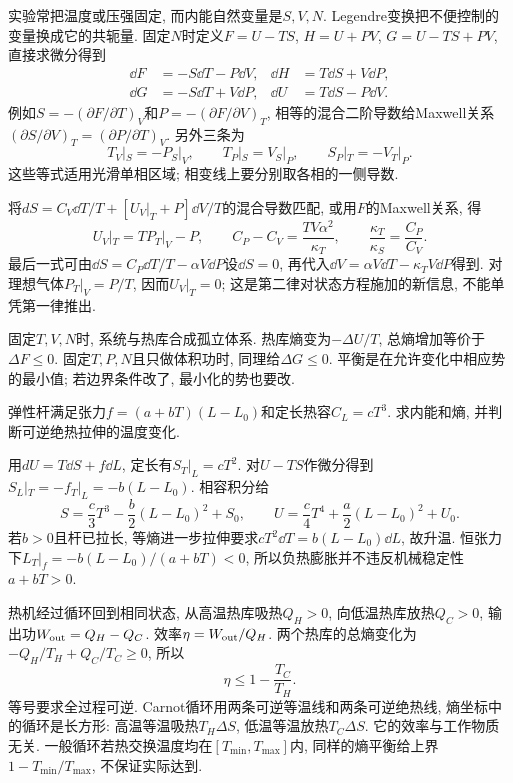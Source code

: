\label{ch:potentials}
实验常把温度或压强固定, 而内能自然变量是$S,V,N$. Legendre变换把不便控制的变量换成它的共轭量. 固定$N$时定义$F=U-TS$, $H=U+PV$, $G=U-TS+PV$, 直接求微分得到
\[
\begin{aligned}
\dd F&=-S\dd T-P\dd V,&\dd H&=T\dd S+V\dd P,\\
\dd G&=-S\dd T+V\dd P,&\dd U&=T\dd S-P\dd V.
\end{aligned}
\]
例如$S=-(\partial F/\partial T)_V$和$P=-(\partial F/\partial V)_T$, 相等的混合二阶导数给Maxwell关系$(\partial S/\partial V)_T=(\partial P/\partial T)_V$. 另外三条为
\[
T_V|_S=-P_S|_V,\qquad T_P|_S=V_S|_P,\qquad S_P|_T=-V_T|_P.
\]
这些等式适用光滑单相区域; 相变线上要分别取各相的一侧导数.

将$dS=C_V\dd T/T+[U_V|_T+P]\dd V/T$的混合导数匹配, 或用$F$的Maxwell关系, 得
\[
U_V|_T=T P_T|_V-P,\qquad
C_P-C_V=\frac{TV\alpha^2}{\kappa_T},\qquad
\frac{\kappa_T}{\kappa_S}=\frac{C_P}{C_V}.
\]
最后一式可由$\dd S=C_P\dd T/T-\alpha V\dd P$设$\dd S=0$, 再代入$\dd V=\alpha V\dd T-\kappa_TV\dd P$得到. 对理想气体$P_T|_V=P/T$, 因而$U_V|_T=0$; 这是第二律对状态方程施加的新信息, 不能单凭第一律推出.

固定$T,V,N$时, 系统与热库合成孤立体系. 热库熵变为$-\Delta U/T$, 总熵增加等价于$\Delta F\le0$. 固定$T,P,N$且只做体积功时, 同理给$\Delta G\le0$. 平衡是在允许变化中相应势的最小值; 若边界条件改了, 最小化的势也要改.

\begin{example}
弹性杆满足张力$f=(a+bT)(L-L_0)$和定长热容$C_L=cT^3$. 求内能和熵, 并判断可逆绝热拉伸的温度变化.
\end{example}
\begin{solution}
用$dU=T\dd S+f\dd L$, 定长有$S_T|_L=cT^2$. 对$U-TS$作微分得到$S_L|_T=-f_T|_L=-b(L-L_0)$. 相容积分给
\[
S=\frac c3T^3-\frac b2(L-L_0)^2+S_0,\qquad
U=\frac c4T^4+\frac a2(L-L_0)^2+U_0.
\]
若$b>0$且杆已拉长, 等熵进一步拉伸要求$cT^2\dd T=b(L-L_0)\dd L$, 故升温. 恒张力下$L_T|_f=-b(L-L_0)/(a+bT)<0$, 所以负热膨胀并不违反机械稳定性$a+bT>0$.
\end{solution}

热机经过循环回到相同状态, 从高温热库吸热$Q_H>0$, 向低温热库放热$Q_C>0$, 输出功$W_{\rm out}=Q_H-Q_C$. 效率$\eta=W_{\rm out}/Q_H$. 两个热库的总熵变化为$-Q_H/T_H+Q_C/T_C\ge0$, 所以
\[
\eta\le1-\frac{T_C}{T_H}.
\]
等号要求全过程可逆. Carnot循环用两条可逆等温线和两条可逆绝热线, 熵坐标中的循环是长方形: 高温等温吸热$T_H\Delta S$, 低温等温放热$T_C\Delta S$. 它的效率与工作物质无关. 一般循环若热交换温度均在$[T_{\min},T_{\max}]$内, 同样的熵平衡给上界$1-T_{\min}/T_{\max}$, 不保证实际达到.

